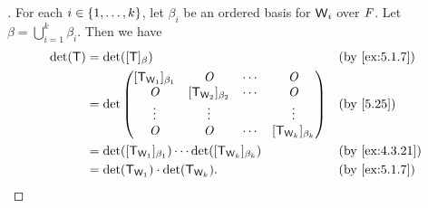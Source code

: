 \begin{proof}[]
  For each \(i \in \left\lbrace1, \dots, k\right\rbrace\), let \(\beta_i\) be an ordered basis for \(\mathsf{W}_i\) over \(\mathit{F}\).
  Let \(\beta = \bigcup_{i = 1}^k \beta_i\).
  Then we have
  \begin{align*}
    \det(\T) & = \det([\T]_{\beta})                                                                            &  & \text{(by \cref{ex:5.1.7})}  \\
             & = \det\begin{pmatrix}
                       [\T_{\W_1}]_{\beta_1} & \zm                   & \cdots & \zm                   \\
                       \zm                   & [\T_{\W_2}]_{\beta_2} & \cdots & \zm                   \\
                       \vdots                & \vdots                &        & \vdots                \\
                       \zm                   & \zm                   & \cdots & [\T_{\W_k}]_{\beta_k}
                     \end{pmatrix} &  & \text{(by \cref{5.25})}                                \\
             & = \det([\T_{\W_1}]_{\beta_1}) \cdots \det([\T_{\W_k}]_{\beta_k})                                &  & \text{(by \cref{ex:4.3.21})} \\
             & = \det(\T_{\W_1}) \cdot \det(\T_{\W_k}).                                                        &  & \text{(by \cref{ex:5.1.7})}
  \end{align*}
\end{proof}
